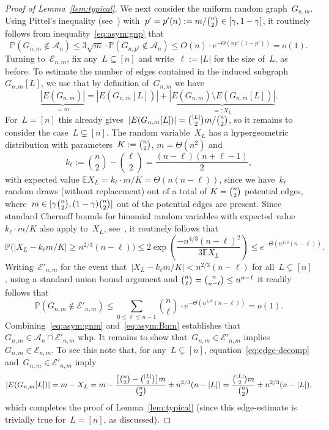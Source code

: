 \documentclass{article}
\renewcommand{\Pr}{\mathbb{P}}
\newcommand{\E}{\mathbb{E}}
\newcommand{\cA}{\mathcal{A}}
\newcommand{\cE}{\mathcal{E}}
\newcommand\lrpar[1]{\left(#1\right)}
\newcommand\bigpar[1]{\bigl(#1\bigr)}
\newcommand\bigsqpar[1]{\bigl[#1\bigr]}
\newcommand{\refL}[1]{Lemma~\ref{#1}}
\begin{document}
\begin{proof}[Proof of \refL{lem:typical}]
We next consider the  uniform random graph~$G_{n,m}$. Using Pittel's inequality (see~\cite[Theorem~2.2]{BB}) with~$p'=p'(n):=m/\tbinom{n}{2} \in [\gamma,1-\gamma]$, it routinely follows from inequality~\eqref{eq:asym:gnp} that
\begin{equation}\label{eq:asym:gnm}
\Pr(G_{n,m} \not\in \cA_n) \le 3 \sqrt{m} \cdot \Pr(G_{n,p'} \not\in \cA_n) \le O(n) \cdot  e^{-\Theta(np'(1-p'))}  = o(1). \end{equation}
Turning to~$\cE_{n,m}$, 
fix any~$L \subseteq [n]$ and write~$\ell := |L|$ for the size of~$L$, as before. 
To estimate the number of edges contained in the induced subgraph~$G_{n,m}[L]$, 
we use that by definition of~$G_{n,m}$ we have
\begin{equation}\label{eq:edge-decomp}
\underbrace{|E(G_{n,m})|}_{=m}
= |E(G_{n,m}[L])| + \underbrace{|E(G_{n,m}) \setminus E(G_{n,m}[L])|}_{=: X_L}.
\end{equation}
For~$L=[n]$ this already  gives~$|E(G_{n,m}[L])|=\tbinom{|L|}{2}m/\tbinom{n}{2}$, 
so it remains to consider the case~${L \subsetneq [n]}$.
The random variable~$X_L$ has a hypergeometric distribution with parameters~$K:=\tbinom{n}{2}$, $m= \Theta(n^2)$ and 
\begin{equation*}k_{\ell}:=\binom{n}{2}-\binom{\ell}{2} = \frac{(n-\ell)(n+\ell-1)}{2},
\end{equation*}
with expected value $\E X_L=k_{\ell} \cdot m/K = \Theta(n(n-\ell))$, 
since we have~$k_{\ell}$ random draws (without replacement) out of a total of $K=\tbinom{n}{2}$ potential edges, 
where~$m \in {[\gamma \tbinom{n}{2},(1-\gamma)\tbinom{n}{2}]}$ out of the potential edges are present. 
Since standard Chernoff bounds for binomial random variables with expected value~$k_{\ell} \cdot m/K$
also apply to~$X_L$, see~\mbox{\cite[Theorem~2.1 and~2.10]{JLR}},
it routinely follows that 
\[
\Pr\bigpar{|X_L-k_{\ell} m/K| \ge n^{2/3}(n-\ell)} \le 2 \exp\lrpar{\frac{-n^{4/3}(n-\ell)^2}{3 \E X_L}} \le e^{-\Theta(n^{1/3}(n-\ell))} . 
\]
Writing~$\cE'_{n,m}$ for the event that~$|X_L-k_{\ell} m/K| < n^{2/3}(n-\ell)$ for all~$L \subsetneq [n]$, using a standard union bound argument and $\tbinom{n}{\ell}=\tbinom{n}{n-\ell}\le n^{n-\ell}$ it readily follows that 
\begin{equation}\label{eq:asym:Bnm}
\Pr(G_{n,m} \not\in \cE'_{n,m}) \le \sum_{0 \le \ell \le n-1}\binom{n}{\ell} \cdot e^{-\Theta(n^{1/3}(n-\ell))} = o(1) .
\end{equation}
Combining~\eqref{eq:asym:gnm} and~\eqref{eq:asym:Bnm} establishes that~$G_{n,m} \in \cA_n \cap \cE'_{n,m}$ whp. 
It remains to show that~$G_{n,m} \in \cE'_{n,m}$ implies~$G_{n,m} \in \cE_{n,m}$. 
To see this note that, for any~$L \subsetneq [n]$, equation~\eqref{eq:edge-decomp} and~$G_{n,m} \in \cE'_{n,m}$ imply
\begin{equation*}|E(G_{n,m}[L])| = m - X_L = m  - \frac{\bigsqpar{\binom{n}{2}-\binom{|L|}{2}}m}{\binom{n}{2}} \pm n^{2/3}(n-|L|) = \frac{\tbinom{|L|}{2}m}{\binom{n}{2}} \pm n^{2/3}(n-|L|),
\end{equation*}
which completes the proof of \refL{lem:typical} (since this edge-estimate is trivially true for~$L=[n]$, as discussed). 
\end{proof}
\end{document}
